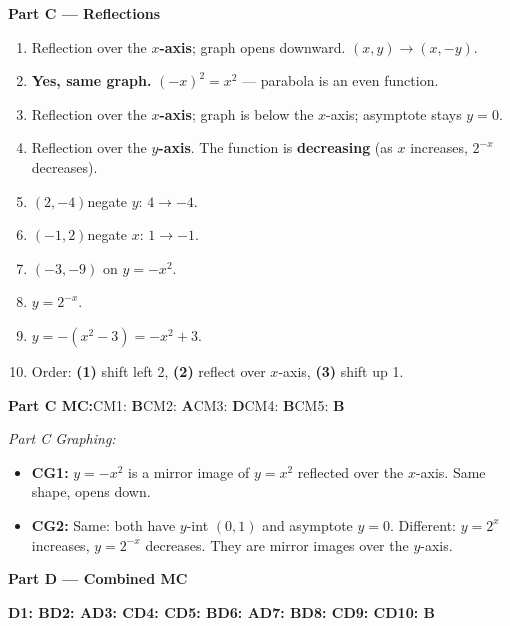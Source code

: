 \documentclass[12pt]{article}
\begin{document}
\vspace{0.5em}
\begin{mdframed}[backgroundcolor=teallight,linecolor=tealmain,linewidth=1.2pt,innerleftmargin=8pt]
{\large\textbf{Part C --- Reflections}}
\end{mdframed}
\begin{enumerate}[label=\textbf{C\arabic*.},leftmargin=*,itemsep=4pt]
\item Reflection over the \textbf{$x$-axis}; graph opens downward. $(x,y)\to(x,-y)$.
\item \textbf{Yes, same graph.} $(-x)^2=x^2$ --- parabola is an even function.
\item Reflection over the \textbf{$x$-axis}; graph is below the $x$-axis; asymptote stays $y=0$.
\item Reflection over the \textbf{$y$-axis}. The function is \textbf{decreasing} (as $x$ increases, $2^{-x}$ decreases).
\item $(2,-4)$\quad negate $y$: $4\to-4$.
\item $(-1,2)$\quad negate $x$: $1\to-1$.
\item $(-3,-9)$ on $y=-x^2$.
\item $y=2^{-x}$.
\item $y=-(x^2-3)=-x^2+3$.
\item Order: \textbf{(1)} shift left 2, \textbf{(2)} reflect over $x$-axis, \textbf{(3)} shift up 1.
\end{enumerate}

\noindent\textbf{Part C MC:}\quad CM1: \textbf{B}\quad CM2: \textbf{A}\quad CM3: \textbf{D}\quad CM4: \textbf{B}\quad CM5: \textbf{B}

\noindent\textit{Part C Graphing:}
\begin{itemize}[itemsep=2pt]
\item \textbf{CG1:} $y=-x^2$ is a mirror image of $y=x^2$ reflected over the $x$-axis. Same shape, opens down.
\item \textbf{CG2:} Same: both have $y$-int $(0,1)$ and asymptote $y=0$. Different: $y=2^x$ increases, $y=2^{-x}$ decreases. They are mirror images over the $y$-axis.
\end{itemize}

\vspace{0.5em}
\begin{mdframed}[backgroundcolor=orangelight,linecolor=orangemain,linewidth=1.2pt,innerleftmargin=8pt]
{\large\textbf{Part D --- Combined MC}}
\end{mdframed}
\noindent\textbf{D1: B}\quad\textbf{D2: A}\quad\textbf{D3: C}\quad\textbf{D4: C}\quad\textbf{D5: B}\quad\textbf{D6: A}\quad\textbf{D7: B}\quad\textbf{D8: C}\quad\textbf{D9: C}\quad\textbf{D10: B}
\end{document}
